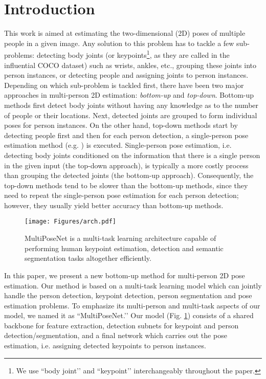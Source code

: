 \documentclass[runningheads]{llncs}
\begin{document}
\section{Introduction}
This work is aimed at estimating  the two-dimensional (2D) poses of multiple people in a given image. Any solution to this problem has to tackle a few sub-problems: detecting body joints (or keypoints\footnote{We use ``body joint’’ and ``keypoint’’ interchangeably throughout the paper.}, as they are called in the influential COCO \cite{Lin2014} dataset) such as wrists, ankles, etc., grouping these joints into person instances, or detecting people and assigning joints to person instances. Depending on which sub-problem is tackled first, there have been two major approaches in multi-person 2D estimation: \textit{bottom-up} and \textit{top-down}. Bottom-up methods \cite{Cao2016, Pishchulin2015a, Insafutdinov2016, Bulata, Iqbal2016a, Ning2017, Newell2016b} first  detect body joints without having any knowledge as to the number of people or their locations. Next, detected joints are  grouped to form individual poses for person instances. On the other hand, top-down methods \cite{Chen2017a, Papandreou2017, He2017a, Fang2017} start by detecting people first and then for each person detection, a single-person pose estimation method (e.g. \cite{Wei2016, Newella, Chou2017, Huang}) is executed. Single-person pose estimation, i.e. detecting body joints conditioned on the information that there is a single person in the given input (the top-down approach), is typically a more costly process than grouping the detected joints  (the bottom-up approach). Consequently, the top-down methods tend to be slower than the bottom-up methods, since they need to repeat the single-person pose estimation for each person detection; however, they usually yield better accuracy than bottom-up methods. 


\begin{figure}
\centering
\texttt{[image: Figures/arch.pdf]}
\caption{MultiPoseNet is a multi-task learning architecture capable of performing human keypoint estimation, detection and semantic segmentation tasks altogether efficiently.}
\label{fig:arch}
\end{figure}


In this paper, we present a new bottom-up method for multi-person 2D pose estimation. Our method is based on a multi-task learning model which can jointly handle the person detection, keypoint detection, person segmentation and pose estimation problems. To emphasize its multi-person and multi-task aspects of our model, we named it as ``MultiPoseNet.’’ Our model (Fig. \ref{fig:arch}) consists of a shared backbone for feature extraction, detection subnets for keypoint and person detection/segmentation, and a final network which carries out the pose estimation, i.e. assigning detected keypoints to person instances. 
\end{document}
